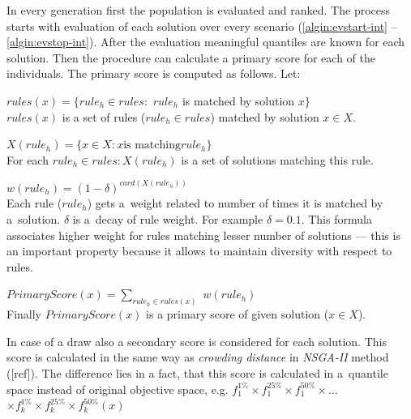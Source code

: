 In every generation first the population is evaluated and ranked. The process
starts with evaluation of each solution over every scenario
(\ref{algin:evstart-int} -- \ref{algin:evstop-int}). After the evaluation
meaningful quantiles are known for each solution. Then the procedure can
calculate a primary score for each of the individuals. The primary score is
computed as follows. Let:

\begin{description}
\item $\textit{rules}(x) = \{\textit{rule}_h \in \textit{rules} :$
$\textit{rule}_h$ is matched by solution $x\}$ \\
$\textit{rules}(x)$ is a set of rules ($\textit{rule}_h \in \textit{rules}$)
matched by solution $x \in X$. 

\item $X(\textit{rule}_h) = \{x \in X: x \text{is matching} \textit{rule}_h\}$
\\ For each $\textit{rule}_h \in rules: X(\textit{rule}_h)$ is a set of
solutions matching this rule.

\item $w(\textit{rule}_h) = (1 - \delta)^{\textit{card}(X(\textit{rule}_h))}$
  \\ Each rule ($\textit{rule}_h$) gets a~weight related to number of times it
  is matched by a~solution. $\delta$ is a~decay of rule weight. For example
  $\delta = 0.1$. This formula associates higher weight for rules matching
  lesser number of solutions --- this is an important property because it
  allows to maintain diversity with respect to rules.

\item $\textit{PrimaryScore}(x) = \sum_{\textit{rule}_h \in rules(x)}$
  $w(\textit{rule}_h)$ \\
Finally $\textit{PrimaryScore}(x)$ is a primary score of given solution ($x \in X$).
\end{description}

In case of a draw also a secondary score is considered for each solution. This
score is calculated in the same way as \textit{crowding distance} in
\textit{NSGA-II} method ([ref]). The difference lies in a fact, that this
score is calculated in a~quantile space instead of original objective space,
e.g. $f^{1\%}_1 \times f^{25\%}_1 \times f^{50\%}_1 \times \dots$
$\times f^{1\%}_k \times f^{25\%}_k \times f^{50\%}_k(x)$

